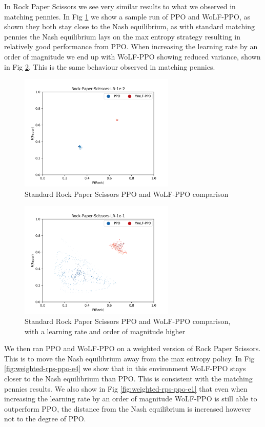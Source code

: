 \documentclass[conference]{IEEEtran}
\begin{document}
In Rock Paper Scissors we see very similar results to what we observed in matching pennies. In Fig \ref{fig:rps-ppo-e2} we show a sample run of PPO and WoLF-PPO, as shown they both stay close to the Nash equilibrium, as with standard matching pennies the Nash equilibrium lays on the max entropy strategy resulting in relatively good performance from PPO. When increasing the learning rate by an order of magnitude we end up with WoLF-PPO showing reduced variance, shown in Fig \ref{fig:rps-ppo-e1}. This is the same behaviour observed in matching pennies.

\begin{figure}
    \centering
    \includegraphics[width=20em]{Figures/rock-paper-scissors-lr-1e-2}
    \caption{Standard Rock Paper Scissors PPO and WoLF-PPO comparison}
    \label{fig:rps-ppo-e2}
\end{figure}

\begin{figure}
    \centering
    \includegraphics[width=20em]{Figures/rock-paper-scissors-lr-1e-1}
    \caption{Standard Rock Paper Scissors PPO and WoLF-PPO comparison, with a learning rate and order of magnitude higher}
    \label{fig:rps-ppo-e1}
\end{figure}

We then ran PPO and WoLF-PPO on a weighted version of Rock Paper Scissors. This is to move the Nash equilibrium away from the max entropy policy. In Fig \ref{fig:weighted-rps-ppo-e4} we show that in this environment WoLF-PPO stays closer to the Nash equilibrium than PPO. This is consistent with the matching pennies results. We also show in Fig \ref{fig:weighted-rps-ppo-e1} that even when increasing the learning rate by an order of magnitude WoLF-PPO is still able to outperform PPO, the distance from the Nash equilibrium is increased however not to the degree of PPO.
\end{document}
